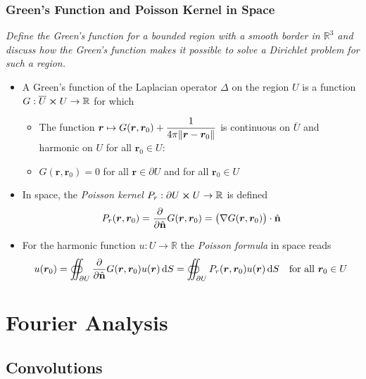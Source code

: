 \documentclass[11pt, a4paper]{article}
\newcommand{\question}[1]{\textit{#1}\vspace{2mm}}
\renewcommand{\grad}{\nabla}
\newcommand{\R}{\mathbb{R}} %
\newcommand{\diff}{\mathop{}\!\mathrm{d}} %
\newcommand{\nhat}{\hat{\mathbf{n}}} %
\begin{document}
\subsubsection{Green's Function and Poisson Kernel in Space}
\question{Define the Green's function for a bounded region with a smooth border in $ \R^{3} $ and discuss how the Green's function makes it possible to solve a Dirichlet problem for such a region.}

\begin{itemize}
	\item A Green's function of the Laplacian operator $ \Delta $ on the region $ U $ is a function $ G : \overline{U} \cross U \to \R $ for which
	\begin{itemize}
		\item The function $ \displaystyle{\bm{r} \mapsto G(\bm{r}, \bm{r}_0) + \frac{1}{4\pi \norm{\bm{r} - \bm{r}_0}}   } $ is continuous on $ \overline{U} $ and harmonic on $ U $ for all $ \bm{r}_0 \in U $:
		\item $ G(\bm{r}, \bm{r}_0) = 0 $ for all $ \bm{r} \in \partial U $ and for all $ \bm{r}_{0} \in U $
	\end{itemize}
	
	\item In space, the \textit{Poisson kernel} $ P_r : \partial U \cross U \to  \R $ is defined 
	\begin{equation*}
		P_r(\bm{r}, \bm{r}_0) = \pdv{}{\nhat} G(\bm{r}, \bm{r}_0)  = \big(\grad{G(\bm{r}, \bm{r}_0)} \big)\cdot \nhat
	\end{equation*}
		
	\item For the harmonic function $ u: U \to \R $ the \textit{Poisson formula} in space reads
	\begin{equation*}
		u(\bm{r}_0) = \oiint_{\partial U} \pdv{}{\nhat} G(\bm{r}, \bm{r}_0) u(\bm{r}) \diff S = \oiint_{\partial U} P_r(\bm{r}, \bm{r}_0) u(\bm{r}) \diff S \quad \text{for all } \bm{r}_{0} \in U
	\end{equation*}
	
\end{itemize}


\newpage 
\section{Fourier Analysis}
\subsection{Convolutions}
\end{document}
